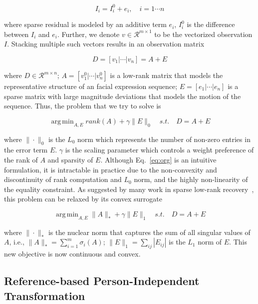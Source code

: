 \documentclass[journal]{IEEEtran}
\DeclareMathOperator*{\argmin}{arg\,min}
\begin{document}
\begin{equation}
I_i = I^{0}_i + e_i,\quad i = 1\cdots n
\end{equation}

\noindent where sparse residual is modeled by an additive term $e_i$, $I^{0}_i$ is the difference between $I_i$ and $e_i$. Further, we denote $v\in\mathscr{R}^{m\times 1}$ to be the vectorized observation $I$. Stacking multiple such vectors results in an observation matrix

\begin{equation}
D = [v_1 | \cdots | v_n] = A + E
\end{equation}

\noindent where $D\in\mathscr{R}^{m\times n}$; $A = [v^{0}_{1} | \cdots | v^{0}_{n}]$ is a low-rank matrix that models the representative structure of an facial expression sequence; $E = [e_{1} | \cdots | e_{n}]$ is a sparse matrix with large magnitude deviations that models the motion of the sequence. Thus, the problem that we try to solve is

\begin{equation} \label{eq:org}
\argmin_{A,E} rank(A)+\gamma \|E\|_0  \quad s.t. \quad D = A + E 
\end{equation}

\noindent where $\|\cdot\|_0$ is the $L_0$ norm which represents the number of non-zero entries in the error term $E$. $\gamma$ is the scaling parameter which controls a weight preference of the rank of $A$ and sparsity of $E$. Although Eq.~\ref{eq:org} is an intuitive formulation, it is intractable in practice due to the non-convexity and discontinuity of rank computation and $L_0$ norm, and the highly non-linearity of the equality constraint. As suggested by many work in sparse low-rank recovery~\cite{Candes11,Lin09,Peng_CVPR10}, this problem can be relaxed by its convex surrogate

\begin{equation} \label{eq:rpca}
\argmin_{A,E} \|A\|_*+\gamma \|E\|_1  \quad s.t. \quad D = A + E 
\end{equation}

\noindent where $\|\cdot\|_*$ is the nuclear norm that captures the sum of all singular values of $A$, i.e., $\|A\|_*=\sum^m_{i=1}\sigma_i(A)$; $\|E\|_1=\sum_{ij}|E_{ij}|$ is the $L_1$ norm of $E$. This new objective is now continuous and convex. 


\subsection{Reference-based Person-Independent Transformation} 
\end{document}
